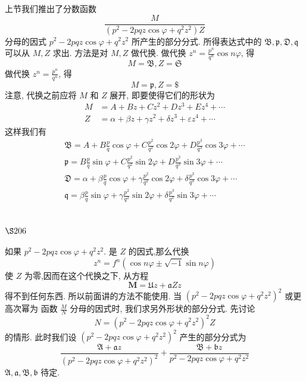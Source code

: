 上节我们推出了分数函数
\[
\frac{M}{\left(p^{2}-2 p q z \cos \varphi+q^{2} z^{2}\right) Z}
\]
分母的因式 $p^{2}-2 p q z \cos \varphi+q^{2} z^{2}$ 所产生的部分分式. 所得表达式中的 $\mathfrak{B}, \mathfrak{p}, \mathfrak{D}, \mathfrak{q}$ 可以从 $M, Z$ 求出. 方法是对 $M, Z$ 做代换. 做代换 $z^{n}=\frac{p^{n}}{q^{n}} \cos n \varphi$, 得
\[
M=\mathfrak{B}, Z=\mathfrak{S}
\]
做代换 $z^{n}=\frac{p^{n}}{q^{n}}$, 得
\[
M=\mathfrak{p}, Z=\$
\]
注意, 代换之前应将 $M$ 和 $Z$ 展开, 即要使得它们的形状为
\[
\begin{aligned}
M & =A+B z+C z^{2}+D z^{3}+E z^{4}+\cdots \\
Z & =\alpha+\beta z+\gamma z^{2}+\delta z^{3}+\varepsilon z^{4}+\cdots
\end{aligned}
\]
这样我们有
\[
\begin{gathered}
\mathfrak{B}=A+B \frac{p}{q} \cos \varphi+C \frac{p^{2}}{q^{2}} \cos 2 \varphi+D \frac{p^{3}}{q^{3}} \cos 3 \varphi+\cdots \\
\mathfrak{p}=B \frac{p}{q} \sin \varphi+C \frac{p^{2}}{q^{2}} \sin 2 \varphi+D \frac{p^{3}}{q^{3}} \sin 3 \varphi+\cdots \\
\mathfrak{D}=\alpha+\beta \frac{p}{q} \cos \varphi+\gamma \frac{p^{2}}{q^{2}} \cos 2 \varphi+\delta \frac{p^{3}}{q^{3}} \cos 3 \varphi+\cdots \\
\mathfrak{q}=\beta \frac{p}{q} \sin \varphi+\gamma \frac{p^{2}}{q^{2}} \sin 2 \varphi+\delta \frac{p^{3}}{q^{3}} \sin 3 \varphi+\cdots
\end{gathered}
\]

\section{$\S 206$}

如果 $p^{2}-2 p q z \cos \varphi+q^{2} z^{2}$. 是 $Z$ 的因式,那么代换
\[
z^{n}=f^{n}(\cos n \varphi \pm \sqrt{-1} \sin n \varphi)
\]
使 $Z$ 为零,因而在这个代换之下, 从方程
\[
\boldsymbol{M}=\mathfrak{U} z+\mathfrak{a} Z z
\]
得不到任何东西. 所以前面讲的方法不能使用. 当 $\left(p^{2}-2 p q z \cos \varphi+q^{2} z^{2}\right)^{2}$ 或更高次幂为 函数 $\frac{M}{N}$ 分母的因式时, 我们求另外形状的部分分式. 先讨论
\[
N=\left(p^{2}-2 p q z \cos \varphi+q^{2} z^{2}\right)^{2} Z
\]
的情形. 此时我们设 $\left(p^{2}-2 p q z \cos \varphi+q^{2} z^{2}\right)^{2}$ 产生的部分分式为
\[
\frac{\mathfrak{A}+\mathfrak{a} z}{\left(p^{2}-2 p q z \cos \varphi+q^{2} z^{2}\right)^{2}}+\frac{\mathfrak{B}+\mathfrak{b} z}{p^{2}-2 p q z \cos \varphi+q^{2} z^{2}}
\]
$\mathfrak{A}, \mathfrak{a}, \mathfrak{B}, \mathfrak{b}$ 待定.

